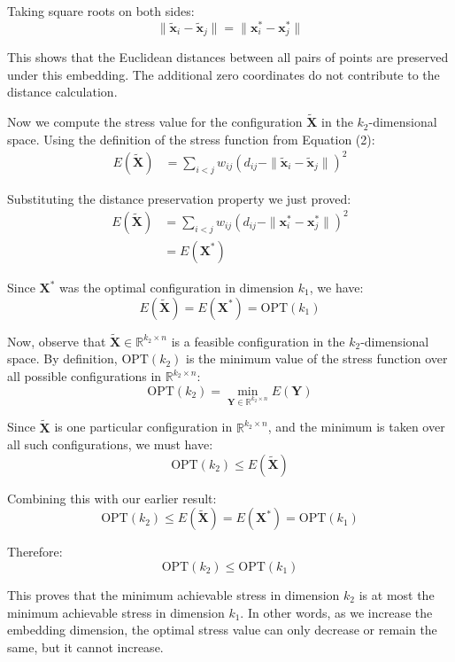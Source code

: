 \documentclass[a4paper]{scrartcl}
\begin{document}
Taking square roots on both sides:
$$\|\tilde{\mathbf{x}}_i - \tilde{\mathbf{x}}_j\| = \|\mathbf{x}_i^* - \mathbf{x}_j^*\|$$

This shows that the Euclidean distances between all pairs of points are preserved under this embedding. The additional zero coordinates do not contribute to the distance calculation.

Now we compute the stress value for the configuration $\tilde{\mathbf{X}}$ in the $k_2$-dimensional space. Using the definition of the stress function from Equation (2):
\begin{align*}
E(\tilde{\mathbf{X}}) &= \sum_{i < j} w_{ij} \left(d_{ij} - \|\tilde{\mathbf{x}}_i - \tilde{\mathbf{x}}_j\|\right)^2
\end{align*}

Substituting the distance preservation property we just proved:
\begin{align*}
E(\tilde{\mathbf{X}}) &= \sum_{i < j} w_{ij} \left(d_{ij} - \|\mathbf{x}_i^* - \mathbf{x}_j^*\|\right)^2 \\
&= E(\mathbf{X}^*)
\end{align*}

Since $\mathbf{X}^*$ was the optimal configuration in dimension $k_1$, we have:
$$E(\tilde{\mathbf{X}}) = E(\mathbf{X}^*) = \text{OPT}(k_1)$$

Now, observe that $\tilde{\mathbf{X}} \in \mathbb{R}^{k_2 \times n}$ is a feasible configuration in the $k_2$-dimensional space. By definition, $\text{OPT}(k_2)$ is the minimum value of the stress function over all possible configurations in $\mathbb{R}^{k_2 \times n}$:
$$\text{OPT}(k_2) = \min_{\mathbf{Y} \in \mathbb{R}^{k_2 \times n}} E(\mathbf{Y})$$

Since $\tilde{\mathbf{X}}$ is one particular configuration in $\mathbb{R}^{k_2 \times n}$, and the minimum is taken over all such configurations, we must have:
$$\text{OPT}(k_2) \leq E(\tilde{\mathbf{X}})$$

Combining this with our earlier result:
$$\text{OPT}(k_2) \leq E(\tilde{\mathbf{X}}) = E(\mathbf{X}^*) = \text{OPT}(k_1)$$

Therefore:
$$\text{OPT}(k_2) \leq \text{OPT}(k_1)$$

This proves that the minimum achievable stress in dimension $k_2$ is at most the minimum achievable stress in dimension $k_1$. In other words, as we increase the embedding dimension, the optimal stress value can only decrease or remain the same, but it cannot increase.
\end{document}
